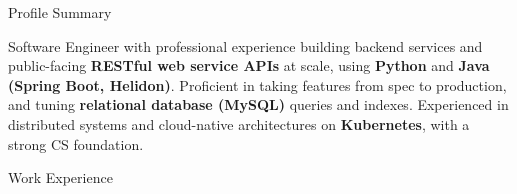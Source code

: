 \documentclass{resume}
\begin{document}
\begin{rSection}{Profile Summary}

Software Engineer with professional experience building backend services and public-facing \textbf{RESTful web service APIs} at scale, using \textbf{Python} and \textbf{Java (Spring Boot, Helidon)}. Proficient in taking features from spec to production, and tuning \textbf{relational database (MySQL)} queries and indexes. Experienced in distributed systems and cloud-native architectures on \textbf{Kubernetes}, with a strong CS foundation.

\end{rSection}

\begin{rSection}{Work Experience}


\end{rSection}
\end{document}
